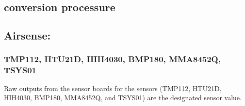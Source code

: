 \subsection{ conversion processure}

\subsection{Airsense:}
\subsubsection{ TMP112, HTU21D, HIH4030, BMP180, MMA8452Q, TSYS01} \label{ssec:first}

Raw outputs from the sensor boards for the sensors (TMP112, HTU21D, HIH4030, BMP180, MMA8452Q, and TSYS01) are the designated sensor value.


% 


